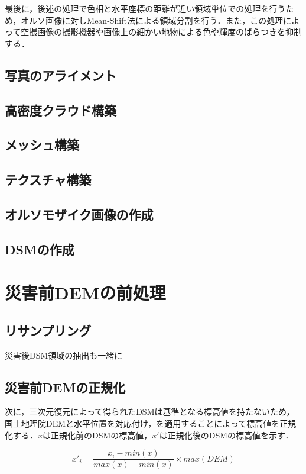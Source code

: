     最後に，後述の処理で色相と水平座標の距離が近い領域単位での処理を行うため，オルソ画像に対しMean-Shift法\cite{論文手法2}による領域分割を行う．また，この処理によって空撮画像の撮影機器や画像上の細かい地物による色や輝度のばらつきを抑制する．


    \subsection{写真のアライメント}
      
    \subsection{高密度クラウド構築}
    \subsection{メッシュ構築}
    \subsection{テクスチャ構築}
    \subsection{オルソモザイク画像の作成}
      \label{オルソ画像}
    \subsection{DSMの作成}




  \section{災害前DEMの前処理}
    \subsection{リサンプリング}
      災害後DSM領域の抽出も一緒に

    \subsection{災害前DEMの正規化}
      次に，三次元復元によって得られたDSMは基準となる標高値を持たないため，国土地理院DEMと水平位置を対応付け，を適用することによって標高値を正規化する．$x$は正規化前のDSMの標高値，$x'$は正規化後のDSMの標高値を示す．

      \begin{equation}
        \label{正規化}
        x'_{i} = \dfrac{x_{i} - min(x)} {max(x) - min(x)} \times max(DEM) 
      \end{equation}
  

